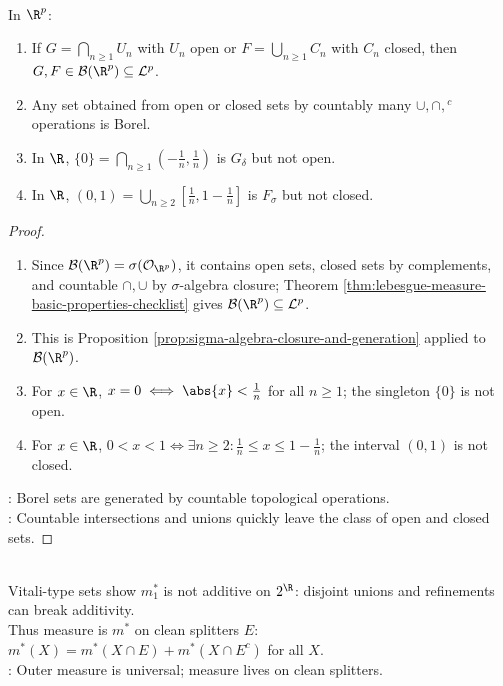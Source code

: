 \begin{proposition} \label{prop:borel-hierarchy-first-examples} \\
In $\R^p$:
\begin{enumerate}[label=(\roman*)]
\setlength{\itemsep}{0pt}
\item If $G=\bigcap\limits_{n\geq1}U_n$ with $U_n$ open or $F=\bigcup\limits_{n\geq1}C_n$ with $C_n$ closed, then $G,F\in\mathcal{B}(\R^p)\subseteq\mathcal{L}^p$.
\item Any set obtained from open or closed sets by countably many $\cup,\cap,{}^c$ operations is Borel.
\item In $\R$, $\{0\}=\bigcap\limits_{n\geq1}(-\frac{1}{n},\frac{1}{n})$ is $G_\delta$ but not open.
\item In $\R$, $(0,1)=\bigcup\limits_{n\geq2}[\frac{1}{n},1-\frac{1}{n}]$ is $F_\sigma$ but not closed.
\end{enumerate}
\begin{proof}
\begin{enumerate}[label=(\roman*)]
\setlength{\itemsep}{0pt}
\item Since $\mathcal{B}(\R^p)=\sigma(\mathcal{O}_{\R^p})$, it contains open sets, closed sets by complements, and countable $\cap,\cup$ by $\sigma$-algebra closure; Theorem \ref{thm:lebesgue-measure-basic-properties-checklist} gives $\mathcal{B}(\R^p)\subseteq\mathcal{L}^p$.
\item This is Proposition \ref{prop:sigma-algebra-closure-and-generation} applied to $\mathcal{B}(\R^p)$.
\item For $x\in\R$, $x=0\iff \abs{x}<\frac{1}{n}$ for all $n\geq1$; the singleton $\{0\}$ is not open.
\item For $x\in\R$, $0<x<1\iff\exists n\geq2:\frac{1}{n}\leq x\leq1-\frac{1}{n}$; the interval $(0,1)$ is not closed.
\end{enumerate}
: Borel sets are generated by countable topological operations.\\
: Countable intersections and unions quickly leave the class of open and closed sets.
\end{proof}
\end{proposition}

\begin{perspective} \label{per:outer-measure-not-enough} \\
Vitali-type sets show $m_1^\ast$ is not additive on $2^\R$: disjoint unions and refinements can break additivity.\\
Thus measure is $m^\ast$ on clean splitters $E$: $m^\ast(X)=m^\ast(X\cap E)+m^\ast(X\cap E^c)$ for all $X$.\\
: Outer measure is universal; measure lives on clean splitters.
\end{perspective}

